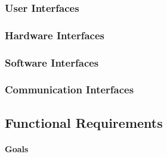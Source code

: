 \documentclass[a4paper]{article}
\begin{document}
\subsubsection{User Interfaces}

\subsubsection{Hardware Interfaces}

\subsubsection{Software Interfaces}

\subsubsection{Communication Interfaces}

\subsection{Functional Requirements}

\paragraph{Goals}
\end{document}
